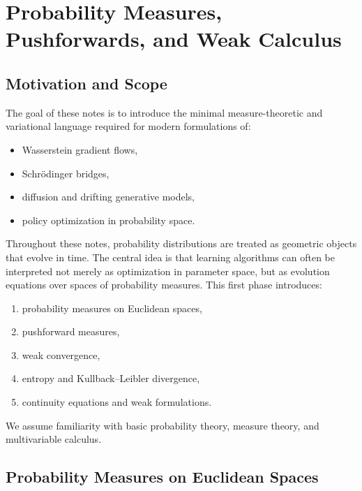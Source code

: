 
\chapter{Probability Measures, Pushforwards, and Weak Calculus}
\section{Motivation and Scope}
The goal of these notes is to introduce the minimal measure-theoretic and variational language required for modern formulations of:
\begin{itemize}
    \item Wasserstein gradient flows,
    \item Schr\"odinger bridges,
    \item diffusion and drifting generative models,
    \item policy optimization in probability space.
\end{itemize}
Throughout these notes, probability distributions are treated as geometric objects that evolve in time. The central idea is that learning algorithms can often be interpreted not merely as optimization in parameter space, but as evolution equations over spaces of probability measures.
This first phase introduces:
\begin{enumerate}[label=(\roman*)]
    \item probability measures on Euclidean spaces,
    \item pushforward measures,
    \item weak convergence,
    \item entropy and Kullback--Leibler divergence,
    \item continuity equations and weak formulations.
\end{enumerate}
We assume familiarity with basic probability theory, measure theory, and multivariable calculus.
\section{Probability Measures on Euclidean Spaces}
